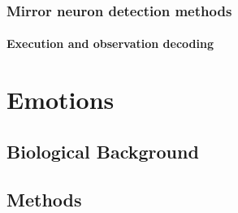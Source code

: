 \documentclass[a4,12pt]{ozu-thesis}
\begin{document}
\subsection{Mirror neuron detection methods}
\subsubsection{Execution and observation decoding}




%
%


\chapter{Emotions}



%

\section{Biological Background}


\section{Methods}

\end{document}

